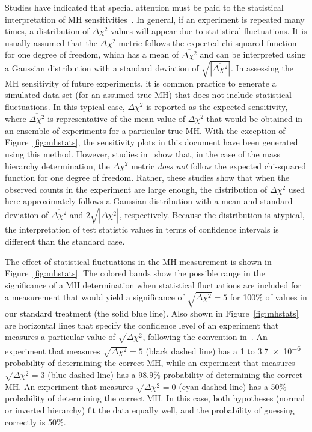 Studies have indicated that special attention must be paid to the statistical interpretation of MH sensitivities~\cite{Qian:2012zn,Blennow:2013oma}.
In general, if an experiment is repeated many times, a distribution of $\Delta\chi^2$
values will appear due to statistical fluctuations.
It is usually assumed that the $\Delta \chi^2$ metric follows the expected chi-squared
function for one degree of freedom, which has a mean of
$\overline{\Delta\chi^2}$ and can be interpreted using a Gaussian
distribution with a standard deviation of
$\sqrt{|\overline{\Delta\chi^2}|}$.
In assessing the MH sensitivity of future experiments, it is common practice to generate
a simulated data set (for an assumed true MH) that does not include statistical fluctuations. 
In this typical case, $\overline{\Delta\chi^2}$ is reported as the expected sensitivity, 
where $\overline{\Delta\chi^2}$ is representative of the mean value of $\Delta\chi^2$ that 
would be obtained in an ensemble of experiments for a particular true MH.  
With the exception of Figure~\ref{fig:mhstats}, the sensitivity plots
in this document have been generated using this method.
However, studies in~\cite{Qian:2012zn,Blennow:2013oma}
show that, in the case of the mass hierarchy
determination, the $\Delta \chi^2$ metric {\em does not} follow the expected chi-squared
function for one degree of freedom.  Rather, these studies show that
when the observed counts in the experiment are large enough,
the distribution of $\Delta\chi^2$ used here approximately follows
a Gaussian distribution with a
mean and standard deviation of $\overline{\Delta\chi^2}$ and
$2\sqrt{|\overline{\Delta\chi^2}|}$, respectively. Because the distribution is atypical, the interpretation of 
test statistic values in terms of confidence intervals is different than the standard case.

The effect of statistical fluctuations in the MH measurement is shown in Figure~\ref{fig:mhstats}.  The colored bands show
the possible range in the significance of a MH determination when statistical
fluctuations are included for a measurement that would yield a significance of $\sqrt{\overline{\Delta\chi^{2}}} = 5$
for 100\% of \deltacp values in our standard treatment (the solid blue line).  Also shown in 
Figure~\ref{fig:mhstats} are horizontal lines that specify the confidence level of an experiment that measures a particular
value of $\sqrt{\Delta \chi^2}$, following the convention in~\cite{Qian:2012zn}. An experiment that measures
$\sqrt{\Delta \chi^2} = 5$ (black dashed line) has a 1 to \num{3.7e-6}
 probability of determining the
correct MH, while an experiment that measures$\sqrt{\Delta \chi^2} = 3$ (blue dashed line) has a 98.9\% 
probability of determining the correct MH. An experiment that measures $\sqrt{\Delta \chi^2} = 0$ (cyan dashed line)
has a 50\% probability of determining the correct MH.  In this case, both hypotheses (normal or inverted hierarchy) 
fit the data equally well, and the probability of guessing correctly is 50\%.

